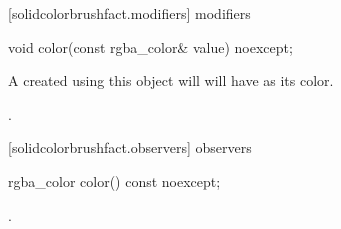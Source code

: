  [solidcolorbrushfact.modifiers] { modifiers}

\begin{itemdecl}
    void color(const rgba_color& value) noexcept;
\end{itemdecl}
\begin{itemdescr}
	\pnum
	\effects
	A  created using this object will will have  as its color.
	
	\pnum
	\postcondition
	.
	
\end{itemdescr}

 [solidcolorbrushfact.observers] { observers}

\begin{itemdecl}
    rgba_color color() const noexcept;
\end{itemdecl}
\begin{itemdescr}
	\pnum
	\returns
	.

\end{itemdescr}
